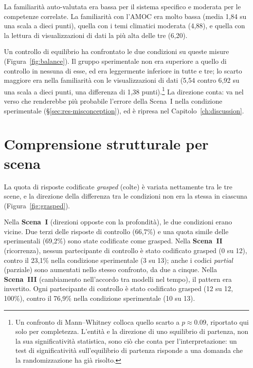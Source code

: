 La familiarità auto-valutata era bassa per il sistema specifico e moderata per le competenze correlate. La familiarità con l'AMOC era molto bassa (media 1,84 su una scala a dieci punti), quella con i temi climatici moderata (4,88), e quella con la lettura di visualizzazioni di dati la più alta delle tre (6,20).

Un controllo di equilibrio ha confrontato le due condizioni su queste misure (Figura~\ref{fig:balance}). Il gruppo sperimentale non era superiore a quello di controllo in nessuna di esse, ed era leggermente inferiore in tutte e tre; lo scarto maggiore era nella familiarità con le visualizzazioni di dati (5,54 contro 6,92 su una scala a dieci punti, una differenza di 1,38 punti).\footnote{Un confronto di Mann--Whitney colloca quello scarto a $p \approx 0.09$, riportato qui solo per completezza. L'entità e la direzione di uno squilibrio di partenza, non la sua significatività statistica, sono ciò che conta per l'interpretazione: un test di significatività sull'equilibrio di partenza risponde a una domanda che la randomizzazione ha già risolto.} La direzione conta: va nel verso che renderebbe più probabile l'errore della Scena~I nella condizione sperimentale (\S\ref{sec:res-misconception}), ed è ripresa nel Capitolo~\ref{ch:discussion}.


\section{Comprensione strutturale per scena}
\label{sec:res-structure}

La quota di risposte codificate \emph{grasped} (colte) è variata nettamente tra le tre scene, e la direzione della differenza tra le condizioni non era la stessa in ciascuna (Figura~\ref{fig:grasped}).

Nella \textbf{Scena~I} (direzioni opposte con la profondità), le due condizioni erano vicine. Due terzi delle risposte di controllo (66,7\%) e una quota simile delle sperimentali (69,2\%) sono state codificate come grasped. Nella \textbf{Scena~II} (ricorrenza), nessun partecipante di controllo è stato codificato grasped (0 su 12), contro il 23,1\% nella condizione sperimentale (3 su 13); anche i codici \emph{partial} (parziale) sono aumentati nello stesso confronto, da due a cinque. Nella \textbf{Scena~III} (cambiamento nell'accordo tra modelli nel tempo), il pattern era invertito. Ogni partecipante di controllo è stato codificato grasped (12 su 12, 100\%), contro il 76,9\% nella condizione sperimentale (10 su 13).

